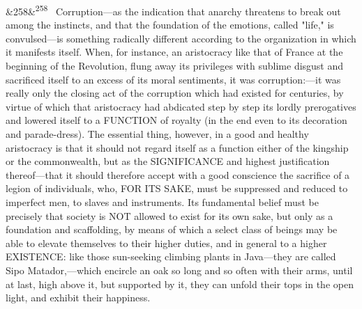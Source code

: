 \documentclass[12pt]{article}
\newcommand{\para}[1][]{\par\noindent\ifx&#1&\else\textsuperscript{\footnotesize #1}~\fi}
\begin{document}
\para[258] Corruption---as the indication that anarchy threatens to break out among the instincts, and that the foundation of the emotions, called "life," is convulsed---is something radically different according to the organization in which it manifests itself. When, for instance, an aristocracy like that of France at the beginning of the Revolution, flung away its privileges with sublime disgust and sacrificed itself to an excess of its moral sentiments, it was corruption:---it was really only the closing act of the corruption which had existed for centuries, by virtue of which that aristocracy had abdicated step by step its lordly prerogatives and lowered itself to a FUNCTION of royalty (in the end even to its decoration and parade-dress). The essential thing, however, in a good and healthy aristocracy is that it should not regard itself as a function either of the kingship or the commonwealth, but as the SIGNIFICANCE and highest justification thereof---that it should therefore accept with a good conscience the sacrifice of a legion of individuals, who, FOR ITS SAKE, must be suppressed and reduced to imperfect men, to slaves and instruments. Its fundamental belief must be precisely that society is NOT allowed to exist for its own sake, but only as a foundation and scaffolding, by means of which a select class of beings may be able to elevate themselves to their higher duties, and in general to a higher EXISTENCE: like those sun-seeking climbing plants in Java---they are called Sipo Matador,---which encircle an oak so long and so often with their arms, until at last, high above it, but supported by it, they can unfold their tops in the open light, and exhibit their happiness.
\end{document}
